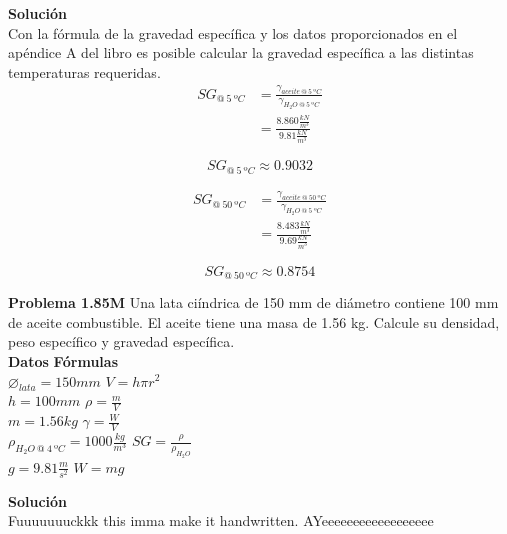 \documentclass[12pt, letterpaper]{article}
\begin{document}
\textbf{Solución} \\
Con la fórmula de la gravedad específica y los datos proporcionados en el apéndice A del libro es posible calcular la gravedad específica a las distintas temperaturas requeridas.
\begin{equation*}
	\begin{split}
		SG_{@\ 5\ ºC} &= \frac{\gamma_{aceite\ @\ 5\ ºC}}{\gamma_{H_2O\ @\ 5\ ºC}}\\
		&= \frac{8.860 \frac{kN}{m^3}}{9.81 \frac{kN}{m^3}}
	\end{split}
\end{equation*}

\begin{equation}
	\boxed{SG_{@\ 5\ ºC} \approx 0.9032}
\end{equation}

\begin{equation*}
	\begin{split}
		SG_{@\ 50\ ºC} &= \frac{\gamma_{aceite\ @\ 50\ ºC}}{\gamma_{H_2O\ @\ 5\ ºC}}\\
		&= \frac{8.483 \frac{kN}{m^3}}{9.69 \frac{kN}{m^3}}
	\end{split}
\end{equation*}

\begin{equation}
	\boxed{SG_{@\ 50\ ºC} \approx 0.8754}
\end{equation}

\textbf{Problema 1.85M} Una lata ciíndrica de 150 mm de diámetro contiene 100 mm de aceite combustible. El aceite tiene una masa de  1.56 kg. Calcule su densidad, peso específico y gravedad específica. \\
\textbf{Datos} \hspace{5cm} \textbf{Fórmulas} \\
$\varnothing_{lata} = 150 mm$ \hspace{3.4cm} $V = h\pi r^2$\\
$h = 100 mm$ \hspace{4cm} $\rho = \frac{m}{V}$\\
$m = 1.56 kg$ \hspace{4cm} $\gamma = \frac{W}{V}$\\
$\rho_{H_2O\ @\ 4\ ºC} = 1000 \frac{kg}{m^3} $ \hspace{2cm} $SG = \frac{\rho}{\rho_{H_2O}}$\\
$g = 9.81 \frac{m}{s^2}$ \hspace{4cm} $W = mg$

\textbf{Solución} \\

Fuuuuuuuckkk this imma make it handwritten. AYeeeeeeeeeeeeeeeeee
\renewcommand\refname{Referencias}
\printbibliography
\end{document}
